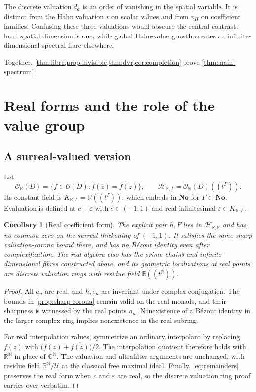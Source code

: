 \documentclass[11pt,letterpaper]{article}
\numberwithin{equation}{section}
\newtheorem{corollary}[theorem]{Corollary}
\theoremstyle{definition}
\theoremstyle{remark}
\newcommand{\C}{\mathbb C}
\newcommand{\R}{\mathbb R}
\newcommand{\N}{\mathbb N}
\newcommand{\No}{\mathbf{No}}
\newcommand{\OO}{\mathcal O}
\newcommand{\HH}{\mathcal H}
\newcommand{\UU}{\mathcal U}
\newcommand{\vH}{v_{\!H}}
\begin{document}
The discrete valuation $d_a$ is an order of vanishing in the spatial
variable. It is distinct from the Hahn valuation $v$ on scalar values
and from $\vH$ on coefficient families. Confusing these three valuations
would obscure the central contrast: local spatial dimension is one,
while global Hahn-value growth creates an infinite-dimensional spectral
fibre elsewhere.

Together, \cref{thm:fibre,prop:invisible,thm:dvr,cor:completion} prove
\cref{thm:main-spectrum}.

\section{Real forms and the role of the value group}\label{sec:real}

\subsection{A surreal-valued version}
Let
\[
 \OO_{\R}(D)=\{f\in\OO(D): f(\overline z)=\overline{f(z)}\},\qquad
 \HH_{\R,\Gamma}=\OO_{\R}(D)((t^\Gamma)).
\]
Its constant field is $K_{\R,\Gamma}=\R((t^\Gamma))$, which embeds in
$\No$ for $\Gamma\subset\No$. Evaluation is defined at
$c+\varepsilon$ with $c\in(-1,1)$ and real infinitesimal
$\varepsilon\in K_{\R,\Gamma}$.

\begin{corollary}[Real coefficient form]\label{cor:real}
The explicit pair $h,F$ lies in $\HH_{\R,\R}$ and has no common zero
on the surreal thickening of $(-1,1)$. It satisfies the same sharp
valuation-corona bound there, and has no B\'ezout identity even after
complexification. The real algebra also has the prime chains and
infinite-dimensional fibres constructed above, and its geometric
localizations at real points are discrete valuation rings with residue
field $\R((t^\R))$.
\end{corollary}
\begin{proof}
All $a_n$ are real, and $h,e_n$ are invariant under complex conjugation.
The bounds in \cref{prop:sharp-corona} remain valid on the real monads,
and their sharpness is witnessed by the real points $a_n$.
Nonexistence of a B\'ezout identity in the larger complex ring implies
nonexistence in the real subring.

For real interpolation values, symmetrize an ordinary interpolant by
replacing $f(z)$ with
$\bigl(f(z)+\overline{f(\overline z)}\bigr)/2$. The interpolation quotient
therefore holds with $\R^\N$ in place of $\C^\N$. The valuation and
ultrafilter arguments are unchanged, with residue field
$\R^\N/\UU$ at the classical free maximal ideal. Finally,
\eqref{eq:remainders} preserves the real form when $c$ and
$\varepsilon$ are real, so the discrete valuation ring proof carries
over verbatim.
\end{proof}
\end{document}
